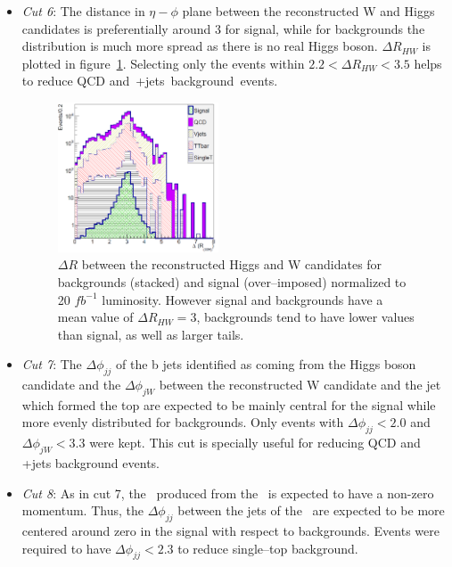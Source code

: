 \begin{itemize}
\item \textit{Cut 6}: The distance in $\eta-\phi$ plane between the reconstructed W and Higgs candidates is preferentially around 3 for signal, while for backgrounds the distribution is much more spread as there is no real Higgs boson. $\Delta R_{HW}$ is plotted in figure~\ref{fig:Var3}. Selecting only the events within $2.2<\Delta R_{HW}<3.5$ helps to reduce QCD and~\W+jets~background~events.

\begin{figure}[!Hhtbp]
  \begin{center}
    \includegraphics[width=0.45\textwidth]{figs/Pheno/DRWH.png}
    \caption{$\Delta R$ between the reconstructed Higgs and W candidates for backgrounds (stacked) and signal (over--imposed) normalized to 20 $fb^{-1}$ luminosity. However signal and backgrounds have a mean value of $\Delta R_{HW}=3$, backgrounds tend to have lower values than signal, as well as larger tails.}
    \label{fig:Var3}
  \end{center}
\end{figure}

\item \textit{Cut 7}: The $\Delta \phi_{jj}$ of the b jets identified as coming from the Higgs boson candidate and the $\Delta \phi_{jW}$ between the reconstructed W candidate and the jet which formed the top are expected to be mainly central for the signal while more evenly distributed for backgrounds. Only events with $\Delta \phi_{jj}<2.0$ and $\Delta \phi_{jW}<3.3$ were kept. This cut is specially useful for reducing QCD and \W+jets background events.

\item \textit{Cut 8}: As in cut 7, the \W~produced from the \Tp~is expected to have a non-zero momentum. Thus, the $\Delta \phi_{jj}$ between the jets of the \W~are expected to be more centered around zero in the signal with respect to backgrounds. Events were required to have $\Delta \phi_{jj}<2.3$ to reduce single--top background.


\end{itemize}
